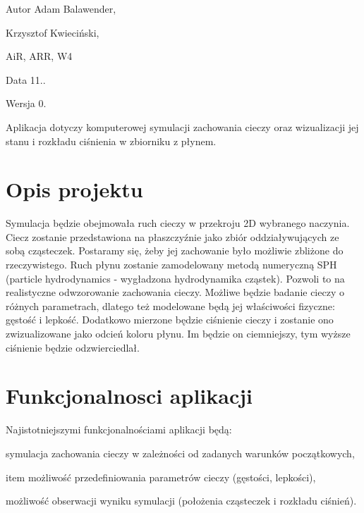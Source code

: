 \begin{DoxyAuthor}{Autor}
Adam Balawender, 

Krzysztof Kwieciński, 

Ai\+R, A\+R\+R, W4 
\end{DoxyAuthor}
\begin{DoxyDate}{Data}
11.. 
\end{DoxyDate}
\begin{DoxyVersion}{Wersja}
0.
\end{DoxyVersion}
Aplikacja dotyczy komputerowej symulacji zachowania cieczy oraz wizualizacji jej stanu i rozkładu ciśnienia w zbiorniku z płynem.\hypertarget{index_etykieta-opis-projektu}{}\section{Opis projektu}\label{index_etykieta-opis-projektu}
Symulacja będzie obejmowała ruch cieczy w przekroju 2\+D wybranego naczynia. Ciecz zostanie przedstawiona na płaszczyźnie jako zbiór oddziaływujących ze sobą cząsteczek. Postaramy się, żeby jej zachowanie było możliwie zbliżone do rzeczywistego. Ruch płynu zostanie zamodelowany metodą numeryczną S\+P\+H (particle hydrodynamics -\/ wygładzona hydrodynamika cząstek). Pozwoli to na realistyczne odwzorowanie zachowania cieczy. Możliwe będzie badanie cieczy o różnych parametrach, dlatego też modelowane będą jej właściwości fizyczne\+: gęstość i lepkość. Dodatkowo mierzone będzie ciśnienie cieczy i zostanie ono zwizualizowane jako odcień koloru płynu. Im będzie on ciemniejszy, tym wyższe ciśnienie będzie odzwierciedlał.\hypertarget{index_etykieta-funkcjonalnosci-aplikacji}{}\section{Funkcjonalnosci aplikacji}\label{index_etykieta-funkcjonalnosci-aplikacji}
Najistotniejszymi funkcjonalnościami aplikacji będą\+:
\begin{DoxyItemize}
\item symulacja zachowania cieczy w zależności od zadanych warunków początkowych,
\item item możliwość przedefiniowania parametrów cieczy (gęstości, lepkości),
\item możliwość obserwacji wyniku symulacji (położenia cząsteczek i rozkładu ciśnień). 
\end{DoxyItemize}